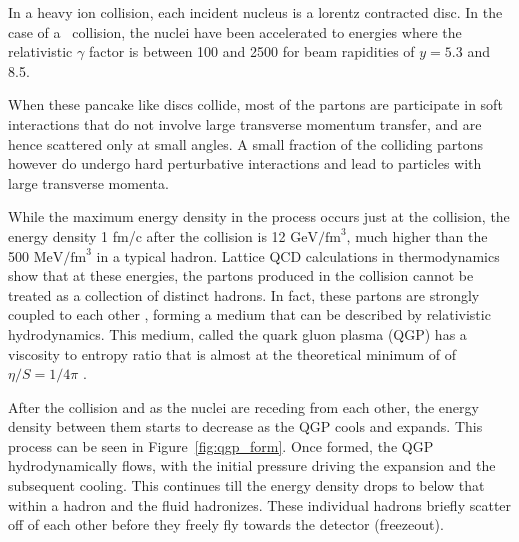 

In a heavy ion collision, each incident nucleus is a lorentz contracted disc. In the case of a \pbpb\ collision, the nuclei have been accelerated to energies where the relativistic $\gamma$ factor is between 100 and 2500 for beam rapidities of $y = 5.3$ and 8.5. 

When these pancake like discs collide, most of the partons are participate in soft interactions that do not involve large transverse momentum transfer, and are hence scattered only at small angles. A small fraction of the colliding partons however do undergo hard perturbative interactions and lead to particles with large transverse momenta.

While the maximum energy density in the process occurs just at the collision, the energy density 1 fm/c after the collision is 12 $\mathrm{GeV} / \mathrm{fm}^3$, much higher than the 500 $\mathrm{MeV} / \mathrm{fm}^3$ in a typical hadron. Lattice QCD calculations in thermodynamics show that at these energies, the partons produced in the collision cannot be treated as a collection of distinct hadrons. In fact, these partons are strongly coupled to each other \cite{???} , forming a medium that can be described by relativistic hydrodynamics. This medium, called the quark gluon plasma (QGP) has a viscosity to entropy ratio that is almost at the theoretical minimum of of $\eta / S = 1/4\pi$ \cite{5,6, check126}. 

After the collision and as the nuclei are receding from each other, the energy density between them starts to decrease as the QGP cools and expands. This process can be seen in Figure~\ref{fig:qgp_form}. Once formed, the QGP hydrodynamically flows, with the initial pressure driving the expansion and the subsequent cooling. This continues till the energy density drops to below that within a hadron and the fluid hadronizes. These individual hadrons briefly scatter off of each other before they freely fly towards the detector (freezeout).

